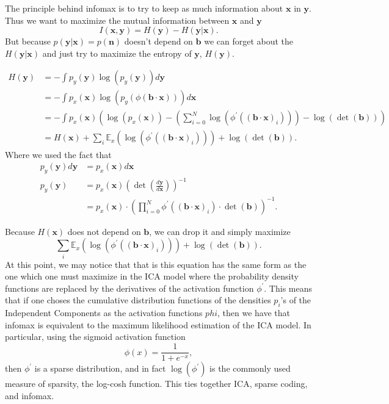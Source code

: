 \documentclass[]{article}
\begin{document}
The principle behind infomax is to try to keep as much information about $\bm{x}$ in $\bm{y}$. Thus we want to maximize the mutual information between $\bm{x}$ and $\bm{y}$
\begin{equation}
\label{infomaxmax}
 I(\bm{x},\bm{y}) = H(\bm{y}) -H(\bm{y}|\bm{x}).
 \end{equation}
 But because $p(\bm{y}|\bm{x}) = p(\bm{n})$ doesn't depend on $\bm{b}$ we can forget about the $H(\bm{y}|\bm{x})$ and just try to maximize the entropy of $\bm{y}$, $H(\bm{y})$.
 
 \begin{align}
\label{deriveinfomax}
H(\bm{y}) & = -\int p_y(\bm{y}) \log(p_y(\bm{y})) d\bm{y} \\
& = -\int p_x( \bm{x} ) \log(p_y( \phi(\bm{b \cdot x}))) d\bm{x} \\
& = -\int p_x( \bm{x} )\left(\log(p_x(\bm{x})) - (\sum_{i=0}^N \log(\phi^\prime((\bm{b \cdot x})_i))) - \log(\det(\bm{b}))\right)\\
& = H(\bm{x}) + \sum_i \mathbb{E}_x\left(\log(\phi^\prime((\bm{b \cdot x})_i))\right) + \log(\det(\bm{b})) .
\end{align}
Where we used the fact that  
 \begin{align}
\label{probident}
p_y( \bm{y}) d\bm{y} & = p_x(\bm{x})  d\bm{x} \\
p_y( \bm{y}) & = p_x(\bm{x}) (\det(\frac{d\bm{y}}{d\bm{x}} ))^{-1} \\
& = p_x(\bm{x}) \cdot \left(\prod_{i=0}^N \phi^\prime((\bm{b \cdot x})_i) \cdot \det(\bm{b})\right)^{-1}.
\end{align}

Because $ H(\bm{x}) $ does not depend on $\bm{b}$, we can drop it and simply maximize
\begin{equation}
\label{finalinfomax}
\sum_i \mathbb{E}_x\left(\log(\phi^\prime((\bm{b \cdot x})_i))\right) + \log(\det(\bm{b})) .
\end{equation}
At this point, we may notice that that is this equation has the same form as the one which one must maximize in the ICA model where the probability density functions are replaced by the derivatives of the activation function $\phi^\prime$. This means that if one choses the cumulative distribution functions of the densities $p_i$'s of the Independent Components as the activation functions $phi$, then we have that infomax is equivalent to the maximum likelihood estimation of the ICA model.  In particular, using the sigmoid activation function 
\begin{equation}
\label{sigmoid}
\phi(x) = \frac{1}{1+e^{-x}} ,
\end{equation}
then $\phi^\prime$ is a sparse distribution, and in fact $\log(\phi^\prime)$ is the commonly used measure of sparsity, the log-cosh function. This ties together ICA, sparse coding, and infomax.  
\end{document}

